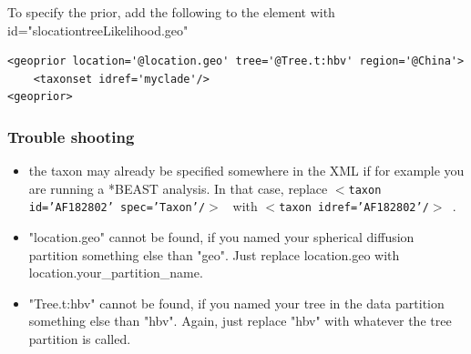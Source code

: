 \documentclass{article}
\begin{document}
To specify the prior, add the following to the element with id="slocationtreeLikelihood.geo"

\begin{verbatim}
<geoprior location='@location.geo' tree='@Tree.t:hbv' region='@China'>
	<taxonset idref='myclade'/>
<geoprior>
\end{verbatim}

\subsubsection*{Trouble shooting}
\begin{itemize}
\item the taxon may already be specified somewhere in the XML if for example you are running a *BEAST analysis. In that case, replace {\tt $<$taxon id='AF182802' spec='Taxon'/$>$ } with {\tt$<$taxon idref='AF182802'/$>$ }.
\item "location.geo" cannot be found, if you named your spherical diffusion partition something else than "geo". Just replace location.geo with location.your\_partition\_name.
\item "Tree.t:hbv" cannot be found, if you named your tree in the data partition something else than "hbv". Again, just replace "hbv" with whatever the tree partition is called.
\end{itemize}




\end{document}
